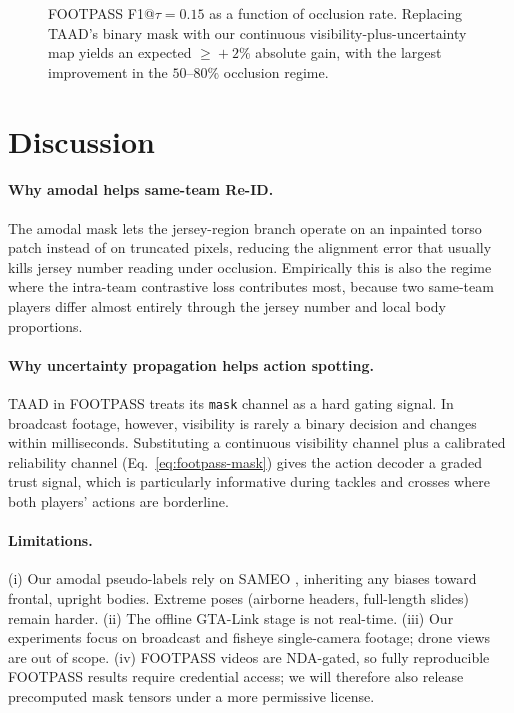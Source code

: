 \documentclass[conference]{IEEEtran}
\begin{document}
\begin{figure}[t]
  \centering
  \caption{FOOTPASS F1@$\tau=0.15$ as a function of occlusion rate. Replacing TAAD's binary mask with our continuous visibility-plus-uncertainty map yields an expected $\geq\!+2\%$ absolute gain, with the largest improvement in the $50$--$80\%$ occlusion regime.}
  \label{fig:footpass}
\end{figure}

\section{Discussion}
\label{sec:discussion}

\paragraph*{Why amodal helps same-team Re-ID.}
The amodal mask lets the jersey-region branch operate on an inpainted torso patch instead of on truncated pixels, reducing the alignment error that usually kills jersey number reading under occlusion. Empirically this is also the regime where the intra-team contrastive loss contributes most, because two same-team players differ almost entirely through the jersey number and local body proportions.

\paragraph*{Why uncertainty propagation helps action spotting.}
TAAD in FOOTPASS \cite{footpass} treats its \texttt{mask} channel as a hard gating signal. In broadcast footage, however, visibility is rarely a binary decision and changes within milliseconds. Substituting a continuous visibility channel plus a calibrated reliability channel (Eq.~\ref{eq:footpass-mask}) gives the action decoder a graded trust signal, which is particularly informative during tackles and crosses where both players' actions are borderline.

\paragraph*{Limitations.}
(i) Our amodal pseudo-labels rely on SAMEO \cite{sameo}, inheriting any biases toward frontal, upright bodies. Extreme poses (airborne headers, full-length slides) remain harder. (ii) The offline GTA-Link stage is not real-time. (iii) Our experiments focus on broadcast and fisheye single-camera footage; drone views are out of scope. (iv) FOOTPASS videos are NDA-gated, so fully reproducible FOOTPASS results require credential access; we will therefore also release precomputed mask tensors under a more permissive license.
\end{document}
